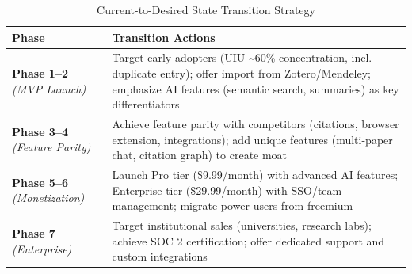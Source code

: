 \begin{table}[H]
    \centering
    \small
    \begin{tabular}{|l|p{10cm}|}
        \hline
        \textbf{Phase}                                         & \textbf{Transition Actions}                                                                                                                 \\
        \hline
        \textbf{Phase 1--2} \newline \textit{(MVP Launch)}     &
        Target early adopters (UIU \textasciitilde{}60\% concentration, incl. duplicate entry); offer import from Zotero/Mendeley; emphasize AI features (semantic search, summaries) as key differentiators \\
        \hline
        \textbf{Phase 3--4} \newline \textit{(Feature Parity)} &
        Achieve feature parity with competitors (citations, browser extension, integrations); add unique features (multi-paper chat, citation graph) to create moat                                          \\
        \hline
        \textbf{Phase 5--6} \newline \textit{(Monetization)}   &
        Launch Pro tier (\$9.99/month) with advanced AI features; Enterprise tier (\$29.99/month) with SSO/team management; migrate power users from freemium                                                \\
        \hline
        \textbf{Phase 7} \newline \textit{(Enterprise)}        &
        Target institutional sales (universities, research labs); achieve SOC 2 certification; offer dedicated support and custom integrations                                                               \\
        \hline
    \end{tabular}
    \caption{Current-to-Desired State Transition Strategy}
    \label{table:transition-strategy}
\end{table}
